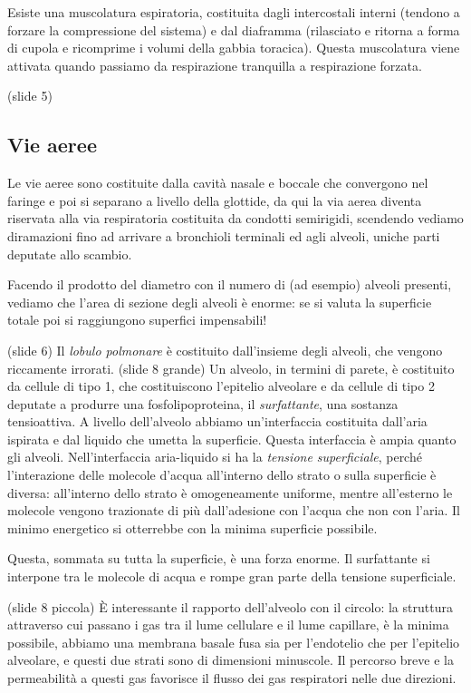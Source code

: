 \documentclass[a4paper,12pt]{article}
\begin{document}
Esiste una muscolatura espiratoria, costituita dagli intercostali interni (tendono a forzare la compressione del sistema) e dal diaframma (rilasciato e ritorna a forma di cupola e ricomprime i volumi della gabbia toracica). Questa muscolatura viene attivata quando passiamo da respirazione tranquilla a respirazione forzata.

(slide 5) \subsection{Vie aeree}
Le vie aeree sono costituite dalla cavità nasale e boccale che convergono nel faringe e poi si separano a livello della glottide, da qui la via aerea diventa riservata alla via respiratoria costituita da condotti semirigidi, scendendo vediamo diramazioni fino ad arrivare a bronchioli terminali ed agli alveoli, uniche parti deputate allo scambio. 

Facendo il prodotto del diametro con il numero di (ad esempio) alveoli presenti, vediamo che l'area di sezione degli alveoli è enorme: se si valuta la superficie totale poi si raggiungono superfici impensabili!

(slide 6) Il \emph{lobulo polmonare} è costituito dall'insieme degli alveoli, che vengono riccamente irrorati. (slide 8 grande) Un alveolo, in termini di parete, è costituito da cellule di tipo 1, che costituiscono l'epitelio alveolare e da cellule di tipo 2 deputate a produrre una fosfolipoproteina, il \emph{surfattante}, una sostanza tensioattiva. A livello dell'alveolo abbiamo un'interfaccia costituita dall'aria ispirata e dal liquido che umetta la superficie. Questa interfaccia è ampia quanto gli alveoli. Nell'interfaccia aria-liquido si ha la \emph{tensione superficiale}, perché l'interazione delle molecole d'acqua all'interno dello strato o sulla superficie è diversa: all'interno dello strato è omogeneamente uniforme, mentre all'esterno le molecole vengono trazionate di più dall'adesione con l'acqua che non con l'aria. Il minimo energetico si otterrebbe con la minima superficie possibile.

Questa, sommata su tutta la superficie, è una forza enorme. Il surfattante si interpone tra le molecole di acqua e rompe gran parte della tensione superficiale.

(slide 8 piccola) È interessante il rapporto dell'alveolo con il circolo: la struttura attraverso cui passano i gas tra il lume cellulare e il lume capillare, è la minima possibile, abbiamo una membrana basale fusa sia per l'endotelio che per l'epitelio alveolare, e questi due strati sono di dimensioni minuscole. Il percorso breve e la permeabilità a questi gas favorisce il flusso dei gas respiratori nelle due direzioni.
\end{document}
